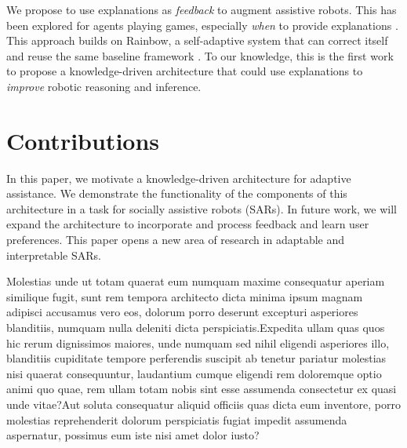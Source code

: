 \documentclass[letterpaper]{article}
\begin{document}
We propose to use explanations as \emph{feedback} to augment assistive
robots.  This has been explored for agents playing games, especially
\emph{when} to provide explanations \cite{li2020reasoning}.  This approach
builds on Rainbow, a self-adaptive system that can correct itself and
reuse the same baseline framework \cite{rainbow}.  To our knowledge,
this is the first work to propose a knowledge-driven architecture that could use explanations to \emph{improve} robotic reasoning and inference.
\section{Contributions}

In this paper, we motivate a knowledge-driven architecture for adaptive assistance. We demonstrate the functionality of the components of this architecture in a task for socially assistive robots (SARs). In future work, we will expand the architecture to incorporate and process feedback and learn user preferences. This paper opens a new area of research in adaptable and interpretable SARs.


Molestias unde ut totam quaerat eum numquam maxime consequatur aperiam similique fugit, sunt rem tempora architecto dicta minima ipsum magnam adipisci accusamus vero eos, dolorum porro deserunt excepturi asperiores blanditiis, numquam nulla deleniti dicta perspiciatis.Expedita ullam quas quos hic rerum dignissimos maiores, unde numquam sed nihil eligendi asperiores illo, blanditiis cupiditate tempore perferendis suscipit ab tenetur pariatur molestias nisi quaerat consequuntur, laudantium cumque eligendi rem doloremque optio animi quo quae, rem ullam totam nobis sint esse assumenda consectetur ex quasi unde vitae?Aut soluta consequatur aliquid officiis quas dicta eum inventore, porro molestias reprehenderit dolorum perspiciatis fugiat impedit assumenda aspernatur, possimus eum iste nisi amet dolor iusto?\clearpage

\end{document}
